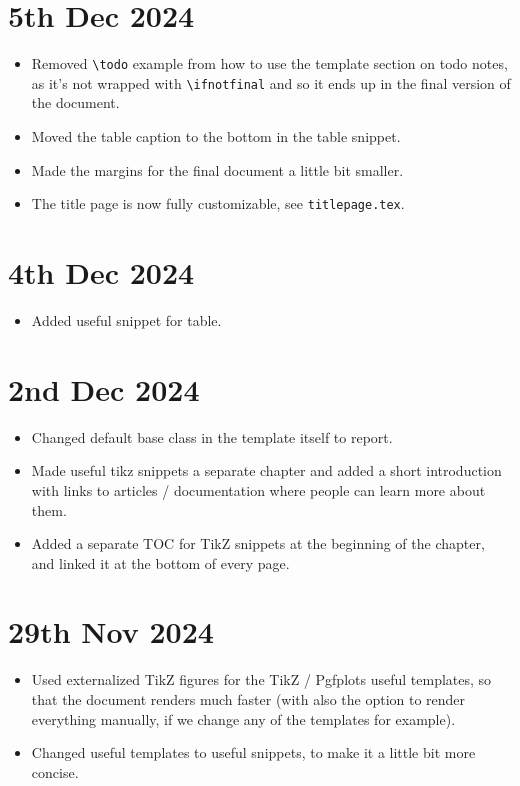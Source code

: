\section*{5th Dec 2024} \label{sec:changelog:2024/12/05}
\begin{itemize}
    \item Removed \verb|\todo| example from how to use the template section on todo notes, as it's not wrapped with \verb|\ifnotfinal| and so it ends up in the final version of the document.
    \item Moved the table caption to the bottom in the table snippet.
    \item Made the margins for the final document a little bit smaller.
    \item The title page is now fully customizable, see \verb|titlepage.tex|.
\end{itemize}

\section*{4th Dec 2024} \label{sec:changelog:2024/12/04}
\begin{itemize}
    \item Added useful snippet for table.
\end{itemize}

\section*{2nd Dec 2024} \label{sec:changelog:2024/12/02}
\begin{itemize}
    \item Changed default base class in the template itself to report.
    \item Made useful tikz snippets a separate chapter and added a short introduction with links to articles / documentation where people can learn more about them.
    \item Added a separate TOC for TikZ snippets at the beginning of the chapter, and linked it at the bottom of every page.
\end{itemize}

\section*{29th Nov 2024} \label{sec:changelog:2024/11/29}
\begin{itemize}
    \item Used externalized TikZ figures for the TikZ / Pgfplots useful templates, so that the document renders much faster (with also the option to render everything manually, if we change any of the templates for example).
    \item Changed useful templates to useful snippets, to make it a little bit more concise.
\end{itemize}

